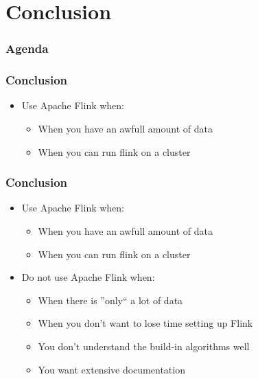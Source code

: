 \section{Conclusion}
\begin{frame}
\frametitle{Agenda}
\tableofcontents[currentsection]
\end{frame}

\begin{frame}
\frametitle{Conclusion}
\begin{itemize}
\item Use Apache Flink when:
	\begin{itemize}
	\item[\checkmark] When you have an awfull amount of data
	\item[\checkmark] When you can run flink on a cluster
	\end{itemize}
\end{itemize}

\end{frame}

\begin{frame}
\frametitle{Conclusion}
\begin{itemize}
\item Use Apache Flink when:
	\begin{itemize}
	\item[\checkmark] When you have an awfull amount of data
	\item[\checkmark] When you can run flink on a cluster
	\end{itemize}
\end{itemize}
\begin{itemize}
\item Do not use Apache Flink when:
	\begin{itemize}
	\item[\checkmark] When there is ''only`` a lot of data
	\item[\checkmark] When you don't want to lose time setting up Flink
	\item[\checkmark] You don't understand the build-in algorithms well
	\item[\checkmark] You want extensive documentation
	\end{itemize}
\end{itemize}
\end{frame}
